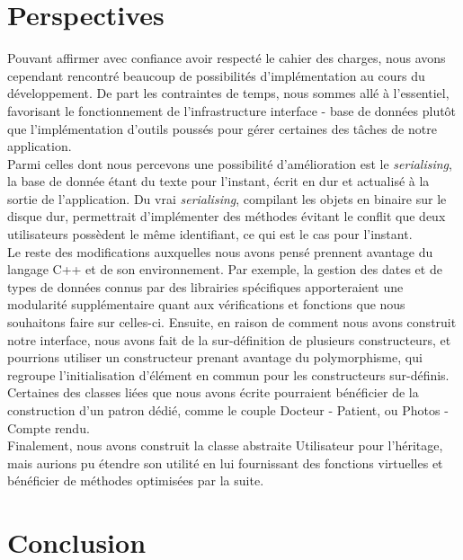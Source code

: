 \documentclass[12pt,a4paper]{article}
\begin{document}
	\begin{multicols}{2}
				
		\section{Perspectives}
		
		Pouvant affirmer avec confiance avoir respecté le cahier des charges, nous avons cependant rencontré beaucoup de possibilités d'implémentation au cours du développement. De part les contraintes de temps, nous sommes allé à l'essentiel, favorisant le fonctionnement de l'infrastructure interface - base de données plutôt que l'implémentation d'outils poussés pour gérer certaines des tâches de notre application. \\
		
		Parmi celles dont nous percevons une possibilité d'amélioration est le \textit{serialising}, la base de donnée étant du texte pour l'instant, écrit en dur et actualisé à la sortie de l'application. Du \og vrai\fg{} \textit{serialising}, compilant les objets en binaire sur le disque dur, permettrait d'implémenter des méthodes évitant le conflit que deux utilisateurs possèdent le même identifiant, ce qui est le cas pour l'instant. \\
		
		Le reste des modifications auxquelles nous avons pensé prennent avantage du langage C++ et de son environnement. Par exemple, la gestion des dates et de types de données connus par des librairies spécifiques apporteraient une modularité supplémentaire quant aux vérifications et fonctions que nous souhaitons faire sur celles-ci. Ensuite, en raison de comment nous avons construit notre interface, nous avons fait de la sur-définition de plusieurs constructeurs, et pourrions utiliser un constructeur prenant avantage du polymorphisme, qui regroupe l'initialisation d'élément en commun pour les constructeurs sur-définis. Certaines des classes liées que nous avons écrite pourraient bénéficier de la construction d'un patron dédié, comme le couple Docteur - Patient, ou Photos - Compte rendu. \\
		
		Finalement, nous avons construit la classe abstraite Utilisateur pour l'héritage, mais aurions pu étendre son utilité en lui fournissant des fonctions virtuelles et bénéficier de méthodes optimisées par la suite. \\
		
		\section{Conclusion}
		

\end{multicols}
\end{document}
